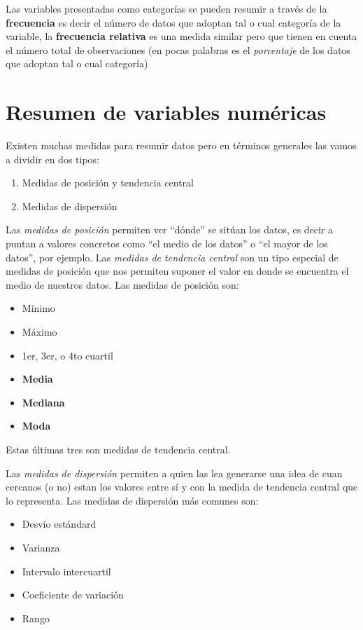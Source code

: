 \documentclass[
]{book}
\providecommand{\tightlist}{%
  \setlength{\itemsep}{0pt}\setlength{\parskip}{0pt}}
\begin{document}
Las variables presentadas como categorías se pueden resumir a través de la \textbf{frecuencia} es decir el número de datos que adoptan tal o cual categoría de la variable, la \textbf{frecuencia relativa} es una medida similar pero que tienen en cuenta el número total de observaciones (en pocas palabras es el \emph{porcentaje} de los datos que adoptan tal o cual categoría)

\hypertarget{resumen-de-variables-numuxe9ricas}{%
\section{Resumen de variables numéricas}\label{resumen-de-variables-numuxe9ricas}}

Existen muchas medidas para resumir datos pero en términos generales las vamos a dividir en dos tipos:

\begin{enumerate}
\def\labelenumi{\arabic{enumi}.}
\tightlist
\item
  Medidas de posición y tendencia central
\item
  Medidas de dispersión
\end{enumerate}

Las \emph{medidas de posición} permiten ver ``dónde'' se sitúan los datos, es decir a puntan a valores concretos como ``el medio de los datos'' o ``el mayor de los datos'', por ejemplo.
Las \emph{medidas de tendencia central} son un tipo especial de medidas de posición que nos permiten suponer el valor en donde se encuentra el medio de nuestros datos. Las medidas de posición son:

\begin{itemize}
\tightlist
\item
  Mínimo
\item
  Máximo
\item
  1er, 3er, o 4to cuartil
\item
  \textbf{Media}
\item
  \textbf{Mediana}
\item
  \textbf{Moda}
\end{itemize}

Estas últimas tres son medidas de tendencia central.

Las \emph{medidas de dispersión} permiten a quien las lea generarse una idea de cuan cercanos (o no) estan los valores entre sí y con la medida de tendencia central que lo representa. Las medidas de dispersión más comunes son:

\begin{itemize}
\tightlist
\item
  Desvío estándard
\item
  Varianza
\item
  Intervalo intercuartil
\item
  Coeficiente de variación
\item
  Rango
\end{itemize}
\end{document}

